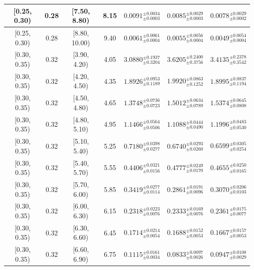 \begin{longtable}{|c|c|c|c|c|c|c|}
\hline
[0.25, 0.30) & 0.28 & [7.50, 8.80) & 8.15 & $0.0091^{ \pm 0.0034 }_{ \pm 0.0003 }$ & $0.0085^{ \pm 0.0029 }_{ \pm 0.0003 }$ & $0.0078^{ \pm 0.0029 }_{ \pm 0.0002 }$ \\ 
\hline
[0.25, 0.30) & 0.28 & [8.80, 10.00) & 9.40 & $0.0061^{ \pm 0.0061 }_{ \pm 0.0004 }$ & $0.0055^{ \pm 0.0056 }_{ \pm 0.0004 }$ & $0.0049^{ \pm 0.0054 }_{ \pm 0.0004 }$ \\ 
\hline
[0.30, 0.35) & 0.32 & [3.90, 4.20) & 4.05 & $3.0880^{ \pm 0.1937 }_{ \pm 0.3204 }$ & $3.6205^{ \pm 0.2400 }_{ \pm 0.3756 }$ & $3.4135^{ \pm 0.2378 }_{ \pm 0.3542 }$ \\ 
\hline
[0.30, 0.35) & 0.32 & [4.20, 4.50) & 4.35 & $1.8926^{ \pm 0.0953 }_{ \pm 0.1189 }$ & $1.9920^{ \pm 0.0863 }_{ \pm 0.1252 }$ & $1.8995^{ \pm 0.0837 }_{ \pm 0.1194 }$ \\ 
\hline
[0.30, 0.35) & 0.32 & [4.50, 4.80) & 4.65 & $1.3748^{ \pm 0.0736 }_{ \pm 0.0723 }$ & $1.5012^{ \pm 0.0634 }_{ \pm 0.0789 }$ & $1.5374^{ \pm 0.0645 }_{ \pm 0.0808 }$ \\ 
\hline
[0.30, 0.35) & 0.32 & [4.80, 5.10) & 4.95 & $1.1466^{ \pm 0.0564 }_{ \pm 0.0506 }$ & $1.1088^{ \pm 0.0444 }_{ \pm 0.0490 }$ & $1.1996^{ \pm 0.0483 }_{ \pm 0.0530 }$ \\ 
\hline
[0.30, 0.35) & 0.32 & [5.10, 5.40) & 5.25 & $0.7180^{ \pm 0.0398 }_{ \pm 0.0277 }$ & $0.6740^{ \pm 0.0293 }_{ \pm 0.0260 }$ & $0.6599^{ \pm 0.0305 }_{ \pm 0.0254 }$ \\ 
\hline
[0.30, 0.35) & 0.32 & [5.40, 5.70) & 5.55 & $0.4406^{ \pm 0.0321 }_{ \pm 0.0156 }$ & $0.4777^{ \pm 0.0249 }_{ \pm 0.0170 }$ & $0.4655^{ \pm 0.0250 }_{ \pm 0.0165 }$ \\ 
\hline
[0.30, 0.35) & 0.32 & [5.70, 6.00) & 5.85 & $0.3419^{ \pm 0.0277 }_{ \pm 0.0114 }$ & $0.2861^{ \pm 0.0191 }_{ \pm 0.0096 }$ & $0.3070^{ \pm 0.0206 }_{ \pm 0.0103 }$ \\ 
\hline
[0.30, 0.35) & 0.32 & [6.00, 6.30) & 6.15 & $0.2318^{ \pm 0.0223 }_{ \pm 0.0076 }$ & $0.2333^{ \pm 0.0169 }_{ \pm 0.0076 }$ & $0.2361^{ \pm 0.0175 }_{ \pm 0.0077 }$ \\ 
\hline
[0.30, 0.35) & 0.32 & [6.30, 6.60) & 6.45 & $0.1714^{ \pm 0.0214 }_{ \pm 0.0054 }$ & $0.1688^{ \pm 0.0152 }_{ \pm 0.0053 }$ & $0.1667^{ \pm 0.0157 }_{ \pm 0.0053 }$ \\ 
\hline
[0.30, 0.35) & 0.32 & [6.60, 6.90) & 6.75 & $0.1115^{ \pm 0.0161 }_{ \pm 0.0034 }$ & $0.0833^{ \pm 0.0097 }_{ \pm 0.0026 }$ & $0.0947^{ \pm 0.0108 }_{ \pm 0.0029 }$ \\ 
\hline

\end{longtable}
